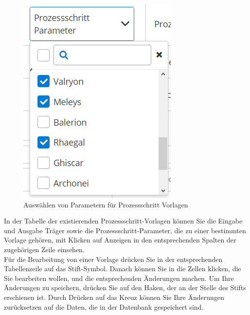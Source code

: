 \documentclass[enabledeprecatedfontcommands,fontsize=12pt,paper=a4,twoside]{scrartcl}
\begin{document}
\begin{figure}[h!]
\begin{center}
 \includegraphics[width=\textwidth]{screenshots/pk/prozessschrittvorlageparameter.png}
  \caption{Auswählen von Parametern für Prozessschritt Vorlagen}
  \label{fig:boat2}
\end{center}
\end{figure}

In der Tabelle der existierenden Prozessschritt-Vorlagen können Sie die Eingabe und Ausgabe Träger sowie die Prozessschritt-Parameter, die zu einer bestimmten Vorlage gehören, mit Klicken auf Anzeigen in den entsprechenden Spalten der zugehörigen Zeile einsehen. \\

Für die Bearbeitung von einer Vorlage drücken Sie in der entsprechenden Tabellenzeile auf das Stift-Symbol. Danach können Sie in die Zellen klicken, die Sie bearbeiten wollen, und die entsprechenden Änderungen machen. Um Ihre Änderungen zu speichern, drücken Sie auf den Haken, der an der Stelle des Stifts erschienen ist. Durch Drücken auf das Kreuz können Sie Ihre Änderungen zurücksetzen auf die Daten, die in der Datenbank gespeichert sind. \\
\end{document}
